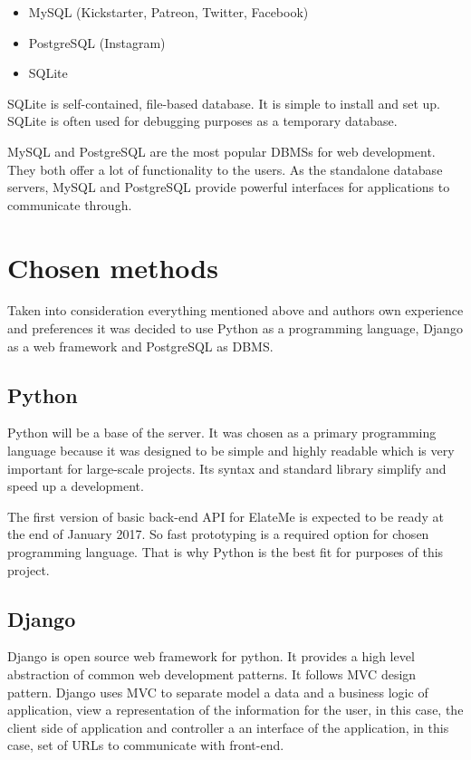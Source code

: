 \documentclass[12pt,a4paper]{report}
\begin{document}
\begin{itemize}
	\item MySQL (Kickstarter, Patreon, Twitter, Facebook)
	\item PostgreSQL (Instagram)
	\item SQLite
\end{itemize}

SQLite is self-contained, file-based database. It is simple to install and set up. SQLite is often used for debugging purposes as a temporary database.\par
MySQL and PostgreSQL are the most popular \ac{DBMS}s for web development. They both offer a lot of functionality to the users. As the standalone database servers, MySQL and PostgreSQL provide powerful interfaces for applications to communicate through.



\section{Chosen methods}

Taken into consideration everything mentioned above and authors own experience and preferences it was decided to use Python as a programming language, Django as a web framework and PostgreSQL as \ac{DBMS}.


	\subsection{Python}
	
Python will be a base of the server. It was chosen as a primary programming language because it was designed to be simple and highly readable which is very important for large-scale projects. Its syntax and standard library simplify and speed up a development.\par
The first version of basic back-end \ac{API} for ElateMe is expected to be ready at the end of January 2017. So fast prototyping is a required option for chosen programming language. That is why Python is the best fit for purposes of this project.

	
	\subsection{Django}

Django\cite{django} is open source web framework for python. It provides a high level abstraction of common web development patterns. It follows \ac{MVC} design pattern. Django uses \ac{MVC} to separate model a data and a business logic of application, view a representation of the information for the user, in this case, the client side of application and controller a an interface of the application, in this case, set of URLs to communicate with front-end.
\end{document}
